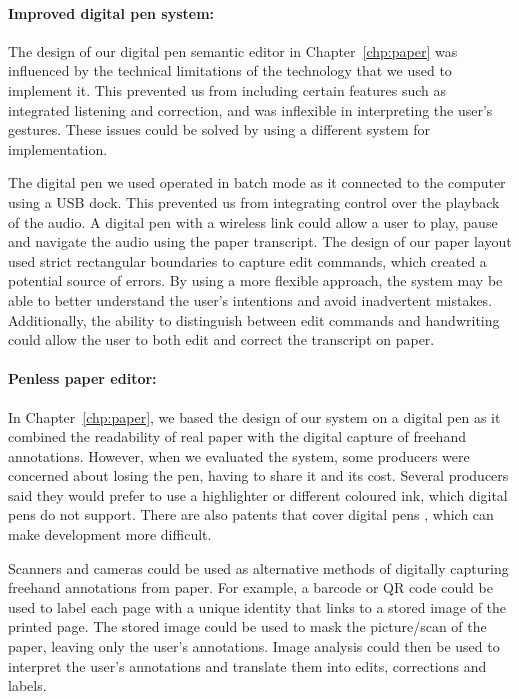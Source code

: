 \paragraph{Improved digital pen system:}

The design of our digital pen semantic editor in Chapter~\ref{chp:paper} was influenced by the technical limitations of
the technology that we used to implement it.  This prevented us from including certain features such as integrated
listening and correction, and was inflexible in interpreting the user's gestures.  These issues could be solved by
using a different system for implementation.

The digital pen we used operated in batch mode as it connected to the
computer using a USB dock. This prevented us from integrating control over the playback of the audio. A digital pen
with a wireless link could allow a user to play, pause and navigate the audio using the paper transcript.  The design
of our paper layout used strict rectangular boundaries to capture edit commands, which created a potential source of
errors. By using a more flexible approach, the system may be able to better understand the user's intentions and avoid
inadvertent mistakes.  Additionally, the ability to distinguish between edit commands and handwriting could allow the
user to both edit and correct the transcript on paper.

\paragraph{Penless paper editor:}

In Chapter~\ref{chp:paper}, we based the design of our system on a digital pen as it combined the readability of real
paper with the digital capture of freehand annotations. However, when we evaluated the system, some producers were
concerned about losing the pen, having to share it and its cost. Several producers said they would prefer to use a
highlighter or different coloured ink, which digital pens do not support. There are also patents that cover digital
pens \citep{Fahraeus2003}, which can make development more difficult.

Scanners and cameras could be used as alternative methods of digitally capturing freehand annotations from paper.  For
example, a barcode or QR code could be used to label each page with a unique identity that links to a stored image of
the printed page. The stored image could be used to mask the picture/scan of the paper, leaving only the user's
annotations. Image analysis could then be used to interpret the user's annotations and translate them into edits,
corrections and labels.

